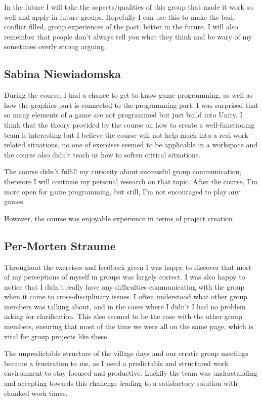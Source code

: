 In the future I will take the aspects/qualities of this group that made it work so well and apply in future groups. Hopefully I can use this to make the bad, conflict filled, group experiences of the past; better in the future. I will also remember that people don’t always tell you what they think and be wary of my sometimes overly strong arguing. 

\subsection{Sabina Niewiadomska}
During the course, I had a chance to get to know game programming, as well as how the graphics part is connected to the programming part. I was surprised that so many elements of a game are not programmed but just build into Unity. I think that the theory provided by the course on how to create a well-functioning team is interesting but I believe the course will not help much into a real work related situations, no one of exercises seemed to be applicable in a workspace and the course also didn't teach us how to soften critical situations. 

The course didn't fulfill my curiosity about successful group communication, therefore I will continue my personal research on that topic. After the course, I'm more open for game programming, but still, I'm not encouraged to play any games. 

However, the course was enjoyable experience in terms of project creation.

\subsection{Per-Morten Straume}
Throughout the exercises and feedback given I was happy to discover that most of my perceptions of myself in groups was largely correct.
I was also happy to notice that I didn’t really have any difficulties communicating with the group when it came to cross-disciplinary issues. I often understood what other group members was talking about, and in the cases where I didn’t I had no problem asking for clarification. This also seemed to be the case with the other group members, ensuring that most of the time we were all on the same page, which is vital for group projects like these.

The unpredictable structure of the village days and our erratic group meetings became a frustration to me, as I need a predictable and structured work environment to stay focused and productive. Luckily the team was understanding and accepting towards this challenge leading to a satisfactory solution with chunked work times. 


